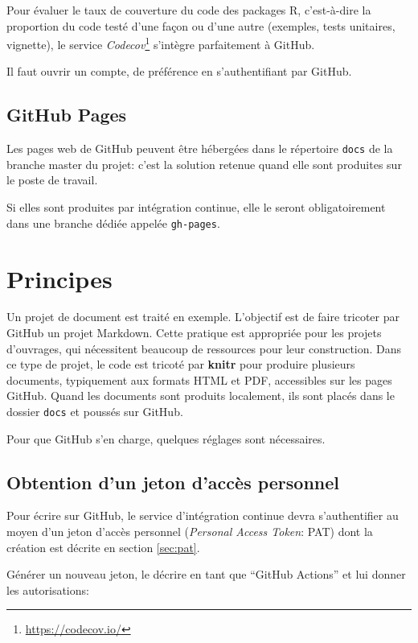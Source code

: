 \documentclass[
  12pt,
  french,
  a4paper,
  extrafontsizes,onecolumn,openright
  ]{memoir}
\newlength{\rf}
\begin{document}
Pour évaluer le taux de couverture du code des packages R, c'est-à-dire la proportion du code testé d'une façon ou d'une autre (exemples, tests unitaires, vignette), le service \emph{Codecov}\footnote{\url{https://codecov.io/}} s'intègre parfaitement à GitHub.

Il faut ouvrir un compte, de préférence en s'authentifiant par GitHub.

\subsection{GitHub Pages}\label{github-pages}

Les pages web de GitHub peuvent être hébergées dans le répertoire \texttt{docs} de la branche master du projet: c'est la solution retenue quand elle sont produites sur le poste de travail.

Si elles sont produites par intégration continue, elle le seront obligatoirement dans une branche dédiée appelée \texttt{gh-pages}.

\section{Principes}\label{principes}

Un projet de document est traité en exemple.
L'objectif est de faire tricoter par GitHub un projet Markdown.
Cette pratique est appropriée pour les projets d'ouvrages, qui nécessitent beaucoup de ressources pour leur construction.
Dans ce type de projet, le code est tricoté par \textbf{knitr} pour produire plusieurs documents, typiquement aux formats HTML et PDF, accessibles sur les pages GitHub.
Quand les documents sont produits localement, ils sont placés dans le dossier \texttt{docs} et poussés sur GitHub.

Pour que GitHub s'en charge, quelques réglages sont nécessaires.

\subsection{Obtention d'un jeton d'accès personnel}\label{obtention-dun-jeton-daccuxe8s-personnel}

Pour écrire sur GitHub, le service d'intégration continue devra s'authentifier au moyen d'un jeton d'accès personnel (\emph{Personal Access Token}: PAT) dont la création est décrite en section \ref{sec:pat}.

Générer un nouveau jeton, le décrire en tant que \enquote{GitHub Actions} et lui donner les autorisations:
\end{document}
